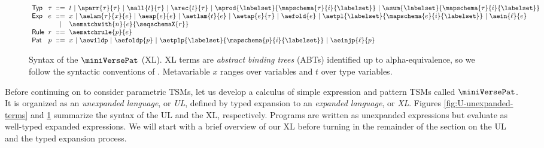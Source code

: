 \documentclass[acmlarge,review,anonymous]{acmart}\settopmatter{printfolios=true}
\begin{document}
\begin{figure}
\begin{minipage}{\textwidth}
$\arraycolsep=3pt\begin{array}{llcl}
\mathsf{Typ} & \tau & ::= & t ~\vert~ \aparr{\tau}{\tau} ~\vert~ \aall{t}{\tau} ~\vert~ \arec{t}{\tau} ~\vert~ \aprod{\labelset}{\mapschema{\tau}{i}{\labelset}} ~\vert~ \asum{\labelset}{\mapschema{\tau}{i}{\labelset}}\\
\mathsf{Exp} & e & ::= & x ~\vert~ \aelam{\tau}{x}{e} ~\vert~ \aeap{e}{e} ~\vert~ \aetlam{t}{e} ~\vert~ \aetap{e}{\tau} ~\vert~ \aefold{e} ~\vert~ \aetpl{\labelset}{\mapschema{e}{i}{\labelset}} ~\vert~ \aein{\ell}{e} \\
& & \vert & \aematchwith{n}{e}{\seqschemaX{r}}\\
\mathsf{Rule} & r & ::= & \aematchrule{p}{e}\\
\mathsf{Pat} & p & ::= & x  ~\vert~ \aewildp ~\vert~ \aefoldp{p} ~\vert~ \aetplp{\labelset}{\mapschema{p}{i}{\labelset}} ~\vert~ \aeinjp{\ell}{p}
\end{array}$
\end{minipage}
\vspace{-10px}
\caption[Syntax of the XL of $\miniVersePat$]{Syntax of the $\miniVersePat$ (XL). XL terms are \emph{abstract binding trees} (ABTs) identified up to alpha-equivalence, so we follow the syntactic conventions of \citet{pfple1}. Metavariable $x$ ranges over variables and $t$ over type variables.  %
}
\vspace{-4px}
\label{fig:U-expanded-terms}
\end{figure}

Before continuing on to consider parametric TSMs, let us develop a calculus of simple expression and pattern TSMs called $\miniVersePat$. It is organized as an \emph{unexpanded language}, or \emph{UL}, defined by typed expansion to an \emph{expanded language}, or \emph{XL}. Figures \ref{fig:U-unexpanded-terms}  and \ref{fig:U-expanded-terms} summarize the syntax of the UL and  the XL, respectively. Programs are written as unexpanded expressions but evaluate as well-typed expanded expressions. We will start with a brief overview of our XL before turning in the remainder of the section on the UL and the typed expansion process.
\end{document}
